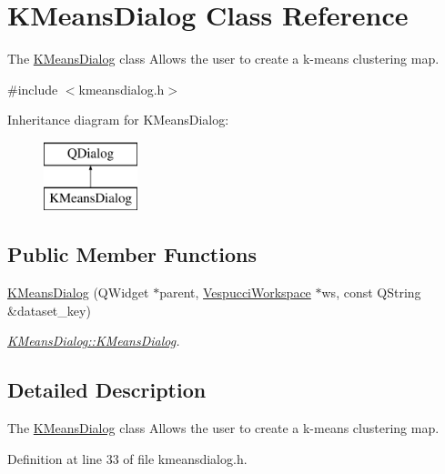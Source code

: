 \hypertarget{class_k_means_dialog}{}\section{K\+Means\+Dialog Class Reference}
\label{class_k_means_dialog}


The \hyperlink{class_k_means_dialog}{K\+Means\+Dialog} class Allows the user to create a k-\/means clustering map.  




{\ttfamily \#include $<$kmeansdialog.\+h$>$}

Inheritance diagram for K\+Means\+Dialog\+:\begin{figure}[H]
\begin{center}
\leavevmode
\includegraphics[height=2.000000cm]{class_k_means_dialog}
\end{center}
\end{figure}
\subsection*{Public Member Functions}
\begin{DoxyCompactItemize}
\item 
\hyperlink{class_k_means_dialog_a9c2dcc34185305b1b64080d925e7058f}{K\+Means\+Dialog} (Q\+Widget $\ast$parent, \hyperlink{class_vespucci_workspace}{Vespucci\+Workspace} $\ast$ws, const Q\+String \&dataset\+\_\+key)
\begin{DoxyCompactList}\small\item\em \hyperlink{class_k_means_dialog_a9c2dcc34185305b1b64080d925e7058f}{K\+Means\+Dialog\+::\+K\+Means\+Dialog}. \end{DoxyCompactList}\end{DoxyCompactItemize}


\subsection{Detailed Description}
The \hyperlink{class_k_means_dialog}{K\+Means\+Dialog} class Allows the user to create a k-\/means clustering map. 

Definition at line 33 of file kmeansdialog.\+h.



